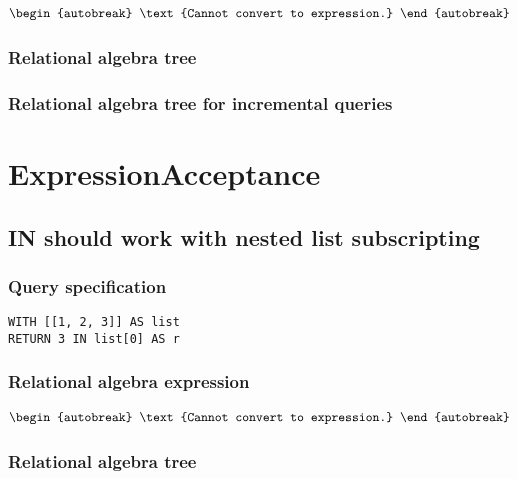 \begin{align*}
\begin{autobreak}
\text{Cannot convert to expression.}
\end{autobreak}
\end{align*}

\subsubsection*{Relational algebra tree}


\subsubsection*{Relational algebra tree for incremental queries}

\section{ExpressionAcceptance}


\subsection{IN should work with nested list subscripting}

\subsubsection*{Query specification}

\begin{lstlisting}
WITH [[1, 2, 3]] AS list
RETURN 3 IN list[0] AS r
\end{lstlisting}

\subsubsection*{Relational algebra expression}

\begin{align*}
\begin{autobreak}
\text{Cannot convert to expression.}
\end{autobreak}
\end{align*}

\subsubsection*{Relational algebra tree}

